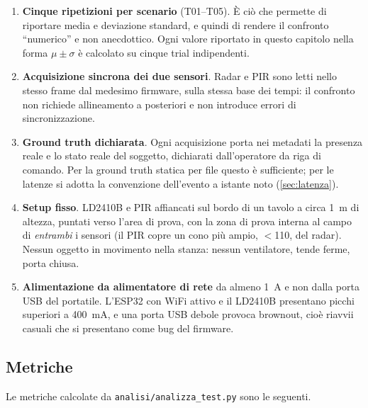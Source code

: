 \begin{enumerate}[leftmargin=1.8em,itemsep=4pt]
  \item \textbf{Cinque ripetizioni per scenario} (T01--T05). È ciò che permette di
        riportare media e deviazione standard, e quindi di rendere il confronto
        ``numerico'' e non anecdottico. Ogni valore riportato in questo capitolo
        nella forma $\mu \pm \sigma$ è calcolato su cinque trial indipendenti.
  \item \textbf{Acquisizione sincrona dei due sensori}. Radar e PIR sono letti nello
        stesso frame dal medesimo firmware, sulla stessa base dei tempi: il
        confronto non richiede allineamento a posteriori e non introduce errori di
        sincronizzazione.
  \item \textbf{Ground truth dichiarata}. Ogni acquisizione porta nei metadati la
        presenza reale e lo stato reale del soggetto, dichiarati dall'operatore da
        riga di comando. Per la ground truth statica per file questo è sufficiente;
        per le latenze si adotta la convenzione dell'evento a istante noto
        (\cref{sec:latenza}).
  \item \textbf{Setup fisso}. LD2410B e PIR affiancati sul bordo di un tavolo a
        circa 1~m di altezza, puntati verso l'area di prova, con la zona di prova
        interna al campo di \emph{entrambi} i sensori (il PIR copre un cono più
        ampio, $<$110\degree, del radar). Nessun oggetto in movimento nella stanza:
        nessun ventilatore, tende ferme, porta chiusa.
  \item \textbf{Alimentazione da alimentatore di rete} da almeno 1~A e non dalla
        porta USB del portatile. L'ESP32 con WiFi attivo e il LD2410B presentano
        picchi superiori a 400~mA, e una porta USB debole provoca brownout, cioè
        riavvii casuali che si presentano come bug del firmware.
\end{enumerate}

\subsection{Metriche}

Le metriche calcolate da \texttt{analisi/analizza\_test.py} sono le seguenti.


